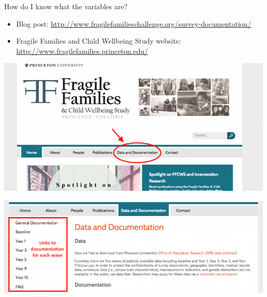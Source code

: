 \documentclass{beamer}
\begin{document}
\begin{frame}

How do I know what the variables are? 
\begin{itemize}
\item Blog post: \textcolor{blue}{\href{www.fragilefamilieschallenge.org/survey-documentation/}{http://www.fragilefamilieschallenge.org/survey-documentation/}}
\item Fragile Families and Child Wellbeing Study website: \textcolor{blue}{\href{www.fragilefamilies.princeton.edu/}{http://www.fragilefamilies.princeton.edu/}}
\end{itemize}

\end{frame}
\begin{frame}

\centering\includegraphics[width = .8\textwidth]{figures/Doc1}

\end{frame}
\begin{frame}

\centering\includegraphics[width = .8\textwidth]{figures/Doc2}

\end{frame}
\end{document}
